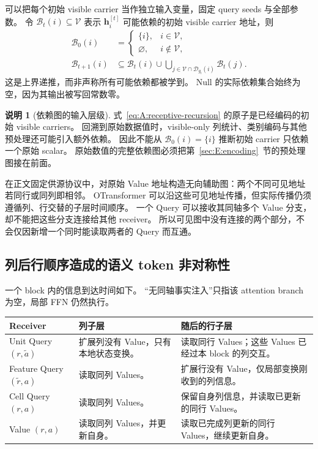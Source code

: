 \documentclass[11pt,UTF8,fontset=fandol]{ctexart}
\numberwithin{equation}{section}
\theoremstyle{definition}
\newtheorem{remark}[definition]{说明}
\newcommand{\Vset}{\mathcal V}
\newcommand{\Dset}{\mathcal D}
\newcommand{\Fstar}{\widetilde r}
\newcommand{\Ustar}{\widetilde a}
\begin{document}
可以把每个初始 visible carrier 当作独立输入变量，固定 query seeds 与全部参数。
令 $\mathcal B_t(i)\subseteq\Vset$ 表示 $\bm h_i^{[t]}$
可能依赖的初始 visible carrier 地址，则
\begin{equation}
 \begin{aligned}
  \mathcal B_0(i)
    &=\begin{cases}\{i\},&i\in\Vset,\\\varnothing,&i\notin\Vset,\end{cases}\\
  \mathcal B_{t+1}(i)
    &\subseteq\mathcal B_t(i)
      \cup\!\bigcup_{j\in\Vset\cap\Dset_{g_t}(i)}\mathcal B_t(j).
 \end{aligned}
 \label{eq:A:receptive-recursion}
\end{equation}
这是上界递推，而非声称所有可能依赖都被学到。
Null 的实际依赖集合始终为空，因为其输出被写回常数零。

\begin{remark}[依赖图的输入层级]
式~\eqref{eq:A:receptive-recursion} 的原子是已经编码的初始 visible carriers。
回溯到原始数据值时，visible-only 列统计、类别编码与其他预处理还可能引入额外依赖。
因此不能从 $\mathcal B_0(i)=\{i\}$ 推断初始 carrier 只依赖一个原始 scalar。
原始数值的完整依赖图必须把第~\ref{sec:E:encoding}~节的预处理图接在前面。
\end{remark}

在正文固定供源协议中，对原始 Value 地址构造无向辅助图：两个不同可见地址若同行或同列即相邻。
OTransformer 可以沿这些可见地址传播，但实际传播仍须遵循列、行交替的子层时间顺序。
一个 Query 可以接收其同轴多个 Value 分支，却不能把这些分支连接给其他 receiver。
所以可见图中没有连接的两个部分，不会仅因新增一个同时能读取两者的 Query 而互通。

\subsection{列后行顺序造成的语义 token 非对称性}
\label{subsec:A:asymmetry}

一个 block 内的信息到达时间如下。
“无同轴事实注入”只指该 attention branch 为空，局部 FFN 仍然执行。

\begin{center}
\small
\begin{tabularx}{\textwidth}{lXX}
\toprule
Receiver & 列子层 & 随后的行子层\\
\midrule
Unit Query $(r,\Ustar)$ & 扩展列没有 Value，只有本地状态变换。 & 读取同行 Values；这些 Values 已经过本 block 的列交互。\\
Feature Query $(\Fstar,a)$ & 读取同列 Values。 & 扩展行没有 Value，仅局部变换刚收到的列信息。\\
Cell Query $(r,a)$ & 读取同列 Values。 & 保留自身列信息，并读取已更新的同行 Values。\\
Value $(r,a)$ & 读取同列 Values，并更新自身。 & 读取已完成列更新的同行 Values，继续更新自身。\\
\bottomrule
\end{tabularx}
\end{center}
\end{document}
